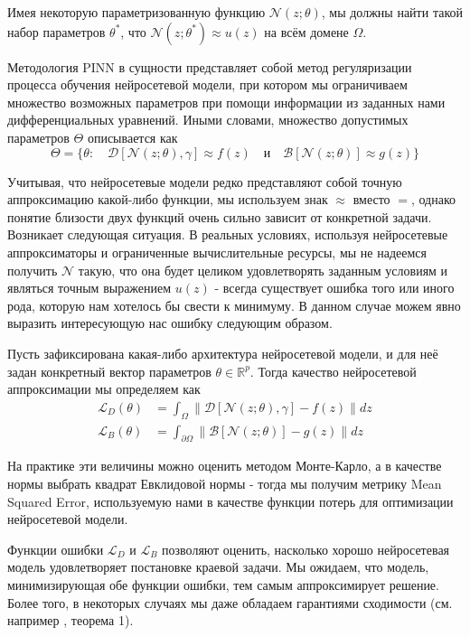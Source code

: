 \documentclass[a4paper, 12pt]{article}
\begin{document}
Имея некоторую параметризованную функцию $\mathcal{N}(z; \theta)$, мы должны найти такой набор параметров $\theta^*$, что $\mathcal{N}(z; \theta^*) \approx u(z)$ на всём домене $\Omega$.

Методология PINN в сущности представляет собой метод регуляризации процесса обучения нейросетевой модели, при котором мы ограничиваем множество возможных параметров при помощи информации из заданных нами дифференциальных уравнений. Иными словами, множество допустимых параметров $\Theta$ описывается как
$$
\Theta = \{\theta : \quad \mathcal{D}[\mathcal{N}(z; \theta), \gamma] \approx f(z) \quad \text{и} \quad \mathcal{B}[\mathcal{N}(z; \theta)] \approx g(z)\}
$$

Учитывая, что нейросетевые модели редко представляют собой точную аппроксимацию какой-либо функции, мы используем знак $\approx$ вместо $=$, однако понятие близости двух функций очень сильно зависит от конкретной задачи. Возникает следующая ситуация. В реальных условиях, используя нейросетевые аппроксиматоры и ограниченные вычислительные ресурсы, мы не надеемся получить $\mathcal{N}$ такую, что она будет целиком удовлетворять заданным условиям и являться точным выражением $u(z)$ - всегда существует ошибка того или иного рода, которую нам хотелось бы свести к минимуму. В данном случае можем явно выразить интересующую нас ошибку следующим образом. 

Пусть зафиксирована какая-либо архитектура нейросетевой модели, и для неё задан конкретный вектор параметров $\theta \in \mathbb{R}^p$. Тогда качество нейросетевой аппроксимации мы определяем как
\begin{equation} \label{eq:pinn:losses}
    \begin{aligned}
    \mathcal{L}_D(\theta) &= \int_{\Omega} \|\mathcal{D}[\mathcal{N}(z; \theta), \gamma] - f(z)\|dz  \\
    \mathcal{L}_B(\theta) &= \int_{\partial \Omega}\|\mathcal{B}[\mathcal{N}(z; \theta)] - g(z)\|dz
    \end{aligned}
\end{equation}

На практике эти величины можно оценить методом Монте-Карло, а в качестве нормы выбрать квадрат Евклидовой нормы - тогда мы получим метрику Mean Squared Error, используемую нами в качестве функции потерь для оптимизации нейросетевой модели.

Функции ошибки $\mathcal{L}_D$ и $\mathcal{L}_B$ позволяют оценить, насколько хорошо нейросетевая модель удовлетворяет постановке краевой задачи. Мы ожидаем, что модель, минимизирующая обе функции ошибки, тем самым аппроксимирует решение. Более того, в некоторых случаях мы даже обладаем гарантиями сходимости (см. например \cite{vandermeer2021optimally}, теорема 1).
\end{document}
